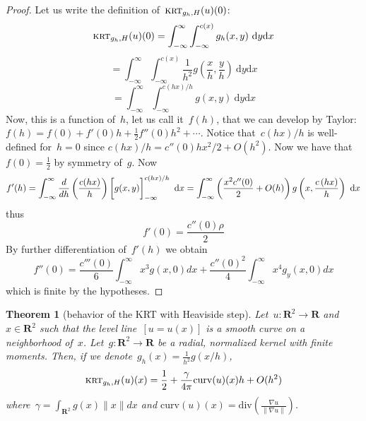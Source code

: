 \documentclass[12pt]{article}                  %
\newtheorem{theorem}{Theorem}
\begin{document}
\begin{proof}
	Let us write the definition of~$\textsc{krt}_{g_h,H}(u)(0)$:
	\[
		\textsc{krt}_{g_h,H}(u)(0)=
		\int_{-\infty}^\infty\int_{-\infty}^{c(x)}
		g_h(x,y)\ %
		\mathrm{d}y
		\mathrm{d}x
	\]
	\[
		=
		\int_{-\infty}^\infty\int_{-\infty}^{c(x)}
		\frac1{h^2}g\left(\frac{x}{h},\frac{y}{h}\right)\ %
		\mathrm{d}y
		\mathrm{d}x
	\]
	\[
		=
		\int_{-\infty}^\infty\int_{-\infty}^{c\left(hx\right)/h}
		g\left(x,y\right)\ %
		\mathrm{d}y
		\mathrm{d}x
	\]
	Now, this is a function of~$h$, let us call it~$f(h)$, that we can
	develop by Taylor:~$f(h)=f(0)+f'(0)h+\frac12f''(0)h^2+\cdots$.
	Notice that~$c(hx)/h$ is well-defined for~$h=0$ since
	$c(hx)/h=c''(0)hx^2/2+O(h^2)$.
	Now we have that~$f(0)=\frac12$ by symmetry of~$g$.  Now
	\[
		f'(h)=
		\int_{-\infty}^\infty \frac{d}{d h}\left(\frac{c(hx)}h\right)
		\left[\vphantom{\int}g(x,y)\right]_{-\infty}^{c(hx)/h}
		\ \mathrm{d}x
		=
		\int_{-\infty}^\infty \left(\frac{x^2c''(0)}2+O(h)\right)
		g\left(x,\frac{c\left(hx\right)}h\right)
		\ \mathrm{d}x
	\]
	thus
	\[
		f'(0)=\frac{c''(0)\rho}2
	\]
	By further differentiation of~$f'(h)$ we obtain
	\[
		f''(0)=
		\frac{c'''(0)}6\int_{-\infty}^\infty x^3g(x,0)dx
		+
		\frac{c''(0)^2}4\int_{-\infty}^\infty x^4g_y(x,0)dx
	\]
	which is finite by the hypotheses.
\end{proof}


\begin{theorem}[behavior of the KRT with Heaviside step]
	\label{thm:krtheaviside}
	Let~$u:\mathbf{R}^2\to\mathbf{R}$ and~$x\in\mathbf{R}^2$ such that
	the level line~$[u=u(x)]$ is a smooth curve on a neighborhood
	of~$x$.  Let~$g:\mathbf{R}^2\to\mathbf{R}$ be a radial,
	normalized kernel with
	finite moments.  Then, if we
	denote~$g_h(x)=\frac{1}{h^2}g(x/h)$,
	\[
		\textsc{krt}_{g_h,H}(u)(x)=\frac12+\frac\gamma{4\pi}\mathrm{curv}(u)(x) h+O(h^2)
	\]
	where~$\gamma=\int_{\mathbf{R}^2}g(x)\|x\|dx$ and
	$\mathrm{curv}(u)(x)=\mathrm{div}\left(\frac{\nabla
	u}{\left\|\nabla u\right\|}\right)$.
\end{theorem}
\end{document}
